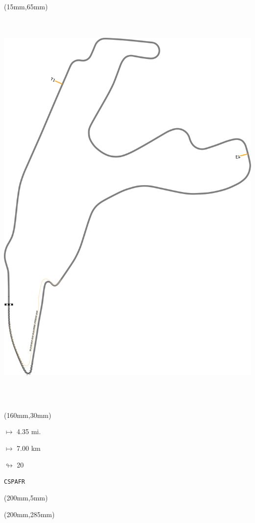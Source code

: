 \begin{textblock*}{185mm}(15mm,65mm)%
\centering
\mbox{\includegraphics[width=185mm,height=210mm,keepaspectratio]{PT/CSPAFR.pdf}}
\end{textblock*}
\begin{textblock*}{40mm}(160mm,30mm)%
\Large
\par$\mapsto$ 4.35 mi.
\par$\mapsto$ 7.00 km
\par$\looparrowright$ 20
\par\hfill\tiny\tt CSPAFR\\
\end{textblock*}
\begin{textblock*}{20mm}(200mm,5mm)%
\fbox{\thepage}
\label{CSPAFR}
\end{textblock*}
\begin{textblock*}{20mm}(200mm,285mm)%
\fbox{\thepage}
\end{textblock*}

